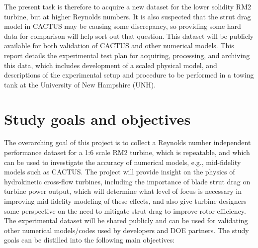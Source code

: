 \documentclass[12pt,letterpaper]{scrreprt}
\begin{document}
The present task is therefore to acquire a new dataset for the lower solidity
RM2 turbine, but at higher Reynolds numbers. It is also suspected that the strut
drag model in CACTUS may be causing some discrepancy, so providing some hard
data for comparison will help sort out that question. This dataset will be
publicly available for both validation of CACTUS and other numerical models.
This report details the experimental test plan for acquiring, processing, and
archiving this data, which includes development of a scaled physical model, and
descriptions of the experimental setup and procedure to be performed in a towing
tank at the University of New Hampshire (UNH).


\section{Study goals and objectives}

The overarching goal of this project is to collect a Reynolds number independent
performance dataset for a 1:6 scale RM2 turbine, which is repeatable, and which
can be used to investigate the accuracy of numerical models, e.g., mid-fidelity
models such as CACTUS. The project will provide insight on the physics of
hydrokinetic cross-flow turbines, including the importance of blade strut drag
on turbine power output, which will determine what level of focus is necessary
in improving mid-fidelity modeling of these effects, and also give turbine
designers some perspective on the need to mitigate strut drag to improve rotor
efficiency. The experimental dataset will be shared publicly and can be used for
validating other numerical models/codes used by developers and DOE partners. The
study goals can be distilled into the following main objectives:
\end{document}
